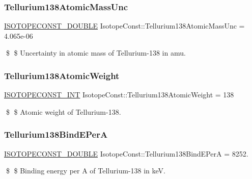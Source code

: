 \subsubsection{\texorpdfstring{Tellurium138\+Atomic\+Mass\+Unc}{Tellurium138AtomicMassUnc}}
{\footnotesize\ttfamily \mbox{\hyperlink{group___isotope_const-_macros_ga8f45a7272ce02c0b4c65c44636ed719a}{I\+S\+O\+T\+O\+P\+E\+C\+O\+N\+S\+T\+\_\+\+D\+O\+U\+B\+LE}} Isotope\+Const\+::\+Tellurium138\+Atomic\+Mass\+Unc = 4.\+065e-\/06}

\$ \$ Uncertainty in atomic mass of Tellurium-\/138 in amu. \mbox{\label{group___isotope_const-_tellurium-_te138_gaa53a82026b334da9ca33cbfe87c6181a}} 
\subsubsection{\texorpdfstring{Tellurium138\+Atomic\+Weight}{Tellurium138AtomicWeight}}
{\footnotesize\ttfamily \mbox{\hyperlink{group___isotope_const-_macros_ga5f18360b3e99483a35c32d789e62621c}{I\+S\+O\+T\+O\+P\+E\+C\+O\+N\+S\+T\+\_\+\+I\+NT}} Isotope\+Const\+::\+Tellurium138\+Atomic\+Weight = 138}

\$ \$ Atomic weight of Tellurium-\/138. \mbox{\label{group___isotope_const-_tellurium-_te138_ga3f3c70818e0069dbb517a8ffa45576d0}} 
\subsubsection{\texorpdfstring{Tellurium138\+Bind\+E\+PerA}{Tellurium138BindEPerA}}
{\footnotesize\ttfamily \mbox{\hyperlink{group___isotope_const-_macros_ga8f45a7272ce02c0b4c65c44636ed719a}{I\+S\+O\+T\+O\+P\+E\+C\+O\+N\+S\+T\+\_\+\+D\+O\+U\+B\+LE}} Isotope\+Const\+::\+Tellurium138\+Bind\+E\+PerA = 8252.}

\$ \$ Binding energy per A of Tellurium-\/138 in keV. \mbox{\label{group___isotope_const-_tellurium-_te138_gafb37762b3ab9225b9cd86a6ef59097c2}} 
